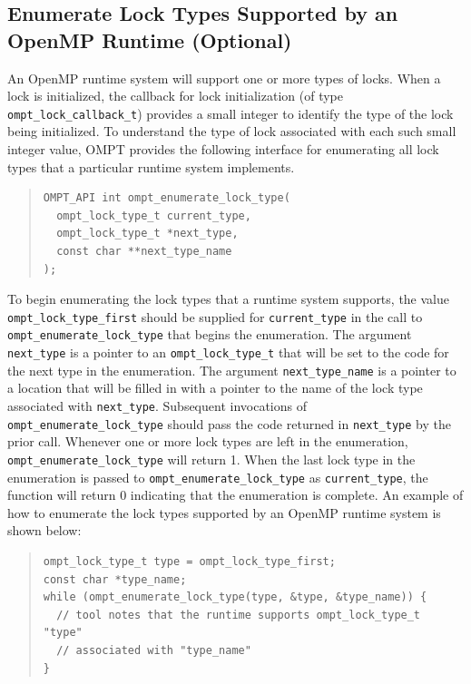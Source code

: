\documentclass{article}
\begin{document}
 \subsection{Enumerate Lock Types Supported by an OpenMP Runtime (Optional)}
 \label{ompt_enumerate_lock_type}
 
An OpenMP runtime system will support one or more types of locks. 
When a lock is initialized, the callback for lock initialization (of type \verb|ompt_lock_callback_t|) provides
a small integer to identify the type of the lock being initialized. 
To understand the type of lock associated with each such small integer value, OMPT provides
the following interface for enumerating all lock types that a particular runtime system implements. 

\begin{quote}
\begin{verbatim}
OMPT_API int ompt_enumerate_lock_type(
  ompt_lock_type_t current_type, 
  ompt_lock_type_t *next_type, 
  const char **next_type_name
);
\end{verbatim}
\end{quote}

\noindent
To begin enumerating the lock types that a runtime system supports,
the value \verb|ompt_lock_type_first| should be supplied for \verb|current_type| in the call to \verb|ompt_enumerate_lock_type| that begins the enumeration.
The argument \verb|next_type| is a pointer to an \verb|ompt_lock_type_t| that will be set to the code for the next type in the enumeration.
The argument \verb|next_type_name| is a pointer to a location that will be filled in with a pointer to the name of the lock type associated with \verb|next_type|. 
Subsequent invocations of \verb|ompt_enumerate_lock_type| should pass the code returned in \verb|next_type| by the prior call.
Whenever one or more lock types are left in the enumeration, \verb|ompt_enumerate_lock_type| will return 1.
When the last lock type in the enumeration is passed to \verb|ompt_enumerate_lock_type| as \verb|current_type|, 
the function will return 0 indicating that the enumeration is complete.
An example of how to enumerate the lock types supported by an OpenMP runtime system is shown below:

\begin{quote}
\begin{verbatim}
ompt_lock_type_t type = ompt_lock_type_first;
const char *type_name;
while (ompt_enumerate_lock_type(type, &type, &type_name)) {
  // tool notes that the runtime supports ompt_lock_type_t "type" 
  // associated with "type_name" 
}
\end{verbatim}
\end{quote}
\end{document}
